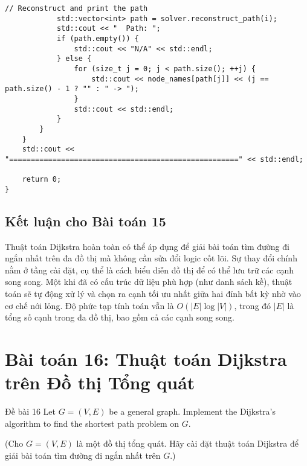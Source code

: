 \documentclass[a4paper,12pt]{article}
\begin{document}
\begin{lstlisting}[style=cppstyle, caption={Xây dựng đa đồ thị trong C++. Logic thuật toán không đổi.}, label={lst:cpp_multi_full}]
            // Reconstruct and print the path
            std::vector<int> path = solver.reconstruct_path(i);
            std::cout << "  Path: ";
            if (path.empty()) {
                std::cout << "N/A" << std::endl;
            } else {
                for (size_t j = 0; j < path.size(); ++j) {
                    std::cout << node_names[path[j]] << (j == path.size() - 1 ? "" : " -> ");
                }
                std::cout << std::endl;
            }
        }
    }
    std::cout << "=====================================================" << std::endl;

    return 0;
}
\end{lstlisting}

\subsection{Kết luận cho Bài toán 15}
Thuật toán Dijkstra hoàn toàn có thể áp dụng để giải bài toán tìm đường đi ngắn nhất trên đa đồ thị mà không cần sửa đổi logic cốt lõi. Sự thay đổi chính nằm ở tầng cài đặt, cụ thể là cách biểu diễn đồ thị để có thể lưu trữ các cạnh song song. Một khi đã có cấu trúc dữ liệu phù hợp (như danh sách kề), thuật toán sẽ tự động xử lý và chọn ra cạnh tối ưu nhất giữa hai đỉnh bất kỳ nhờ vào cơ chế nới lỏng. Độ phức tạp tính toán vẫn là $O(|E| \log |V|)$, trong đó $|E|$ là tổng số cạnh trong đa đồ thị, bao gồm cả các cạnh song song.


\vspace{2cm}


\section{Bài toán 16: Thuật toán Dijkstra trên Đồ thị Tổng quát}

\begin{problembox}{Đề bài 16}
    Let $G = (V,E)$ be a general graph. Implement the Dijkstra's algorithm to find the shortest path problem on $G$.
    
    (Cho $G = (V,E)$ là một đồ thị tổng quát. Hãy cài đặt thuật toán Dijkstra để giải bài toán tìm đường đi ngắn nhất trên $G$.)
\end{problembox}
\end{document}
